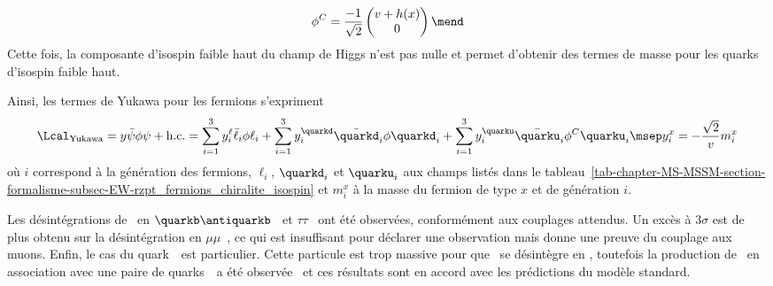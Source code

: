 \begin{equation}
\phi^C =
\frac{-1}{\sqrt{2}}
\begin{pmatrix}
v+h(x)\\0
\end{pmatrix}
\mend
\end{equation}
Cette fois, la composante d'isospin faible haut du champ de Higgs n'est pas nulle et permet d'obtenir des termes de masse pour les quarks d'isospin faible haut.
\par Ainsi, les termes de Yukawa pour les fermions s'expriment
\begin{equation}
\Lcal_\text{Yukawa}
=
y \bar{\psi} \phi \psi + \text{h.c.}
=
\sum_{i=1}^3 y_i^\ell \bar{\ell}_i \phi \ell_i
+ \sum_{i=1}^3 y_i^\quarkd \bar{\quarkd}_i \phi \quarkd_i
+ \sum_{i=1}^3 y_i^\quarku \bar{\quarku}_i \phi^C \quarku_i
\msep
y_i^x = -\frac{\sqrt{2}}{v}m_i^x
\label{eq-chapter-MS-MSSM-section-formalisme-subsec-Higgs_mechanism-subsubsec-fermions-Yukawa_couplings}
\end{equation}
où
$i$ correspond à la génération des fermions,
$\ell_i$, $\quarkd_i$ et $\quarku_i$ aux champs listés dans le tableau~\ref{tab-chapter-MS-MSSM-section-formalisme-subsec-EW-rzpt_fermions_chiralite_isospin}
et
$m_i^x$ à la masse du fermion de type $x$ et de génération $i$.
\par
Les désintégrations de \higgs\
en
$\quarkb\antiquarkb$~\cite{Chatrchyan:2013qga,PhysRevD.89.012003}
et
$\tau\tau$~\cite{Chatrchyan:2014nva}
ont été observées, conformément aux couplages attendus.
Un excès à $3\sigma$
est de plus obtenu sur la désintégration en $\mu\mu$~\cite{CMS-PAS-HIG-19-006},
ce qui est insuffisant pour déclarer une observation mais donne une preuve du couplage aux muons.
Enfin, le cas du quark~\quarkt\ est particulier.
Cette particule est trop massive pour que \higgs\ se désintègre en \quarkt\antiquarkt,
toutefois
la production de \higgs\ en association avec une paire de quarks~\quarkt\ a été observée~\cite{PhysRevLett.120.231801}
et ces résultats sont en accord avec les prédictions du modèle standard.
